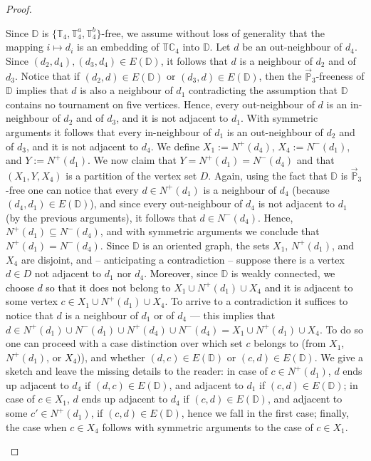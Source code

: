 \documentclass{article}
\theoremstyle{definition}
\theoremstyle{remark}
\newcommand{\blue}[1]{\textcolor{black}{#1}}
\newcommand{\bC}{{\mathbb C}}
\newcommand{\bD}{{\mathbb D}}
\newcommand{\bP}{{\mathbb P}}
\newcommand{\bT}{{\mathbb T}}
\begin{document}
\begin{proof}
\begin{itemize}
        Since $\bD$ is $\{\bT_4,\bT_4^a, \bT_4^b\}$-free, we assume without loss of generality that the mapping $i\mapsto d_i$
        is an embedding of $\bT\bC_4$ into $\bD$. Let $d$ be an out-neighbour of $d_4$. Since
        $(d_2,d_4),(d_3,d_4)\in E(\bD)$, it follows that $d$ is a neighbour of $d_2$ and of $d_3$.
        Notice that if $(d_2,d)\in E(\bD)$ or $(d_3,d)\in E(\bD)$, then the $\vec{\bP}_3$-freeness of
        $\bD$ implies that $d$ is also a neighbour of $d_1$ contradicting the assumption that
        $\bD$ contains no tournament on five vertices. Hence, every out-neighbour of $d$ is
        an in-neighbour of $d_2$ and of $d_3$, and it is not adjacent to $d_1$. With symmetric arguments
        it follows that every in-neighbour of $d_1$ is an out-neighbour of $d_2$ and of $d_3$, and
        it is not adjacent to $d_4$. We define $X_1:=N^+(d_4)$, $X_4:=N^-(d_1)$, and $Y:= N^+(d_1)$.
        We now claim that $Y = N^+(d_1) = N^-(d_4)$ and that $(X_1,Y,X_4)$ is a partition of the vertex set $D$.
        Again, using the fact that $\bD$ is $\vec{\bP}_3$-free one can notice that every $d\in N^+(d_1)$
        is a neighbour of $d_4$ (because $(d_4,d_1)\in E(\bD)$), and since every out-neighbour of
        $d_4$ is not adjacent to $d_1$ (by the previous arguments), it follows that $d\in  N^-(d_4)$. 
        Hence, $N^+(d_1)\subseteq N^-(d_4)$, and with symmetric arguments we conclude that
        $N^+(d_1) = N^-(d_4)$. Since $\bD$ is an oriented graph, the sets $X_1$,  $N^+(d_1)$, and
        $X_4$ are disjoint, and -- anticipating a contradiction -- suppose there is a vertex $d\in D$
        not adjacent to $d_1$ nor $d_4$. \blue{Moreover,} since $\bD$ is weakly connected, \blue{we
        choose $d$ so that it} does not belong to $X_1\cup N^+(d_1) \cup X_4$ \blue{and it}
        is adjacent to some vertex $c\in X_1\cup N^+(d_1) \cup X_4$. To arrive to a contradiction
        it suffices to notice that $d$ is a neighbour of $d_1$ or of $d_4$ --- this implies
        that $d\in N^+(d_1) \cup N^-(d_1) \cup N^+(d_4)\cup N^-(d_4) = X_1\cup N^+(d_1)\cup X_4$.
        To do so one can proceed with a case distinction over which set $c$ belongs to (from $X_1$, 
        $N^+(d_1)$, or \blue{$X_4)$}),
        and whether $(d,c)\in E(\bD)$ or $(c,d)\in E(\bD)$. We give a sketch and leave the missing
        details to the reader: 
        in case of $c\in N^+(d_1)$, $d$ ends up adjacent to $d_4$ if $(d,c)\in E(\bD)$,
        and adjacent to $d_1$ if $(c,d)\in E(\bD)$; in case of $c\in X_1$, $d$ ends up adjacent to $d_4$ 
        if $(c,d)\in E(\bD)$, and adjacent to some $c'\in N^+(d_1)$, if $(c,d)\in E(\bD)$, hence we fall in the first case;
        finally, the case when $c\in X_4$ follows with symmetric arguments to the case of $c\in X_1$.



\end{itemize}
\end{proof}
\end{document}
